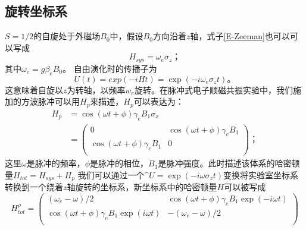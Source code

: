         \subsection{旋转坐标系}
        $S = 1/2$的自旋处于外磁场$B_0$中，假设$B_0$方向沿着$z$轴，式子\ref{E-Zeeman}也可以可以写成
            \begin{equation}
            H_{sys} = \omega_e \sigma_z；
            \end{equation}其中$\omega_e = g \beta_e B_0 $。
        自由演化时的传播子为
            \begin{equation}
            U(t)=exp(-iHt)=\exp(-i\omega_e\sigma_z t)。
            \end{equation}
        这意味着自旋以$z$为转轴，以频率$w_e$旋转。在脉冲式电子顺磁共振实验中，我们施加的方波脉冲可以用$H_p$来描述，$H_p$可以表达为：
            \begin{equation}
            \label{pulse-H}
                \begin{split}
                H_p &= \cos(\omega t+\phi )\gamma_e B_1\sigma_x \\
                    &= \left(
                              \begin{array}{cc}
                               0 & \cos(\omega t+\phi )\gamma_e B_1 \\
                               \cos(\omega t+\phi )\gamma_e B_1 & 0 \\
                              \end{array}
                              \right)
                ；
                \end{split}
            \end{equation}
        这里$\omega$是脉冲的频率，$\phi$是脉冲的相位，$B_1$是脉冲强度。此时描述该体系的哈密顿量$H_{tot} = H_{sys}+H_p$
        我们可以通过一个$\^{U}=\exp(-i\omega\sigma_z t)$变换将实验室坐标系转换到一个绕着$z$轴旋转的坐标系，新坐标系中的哈密顿量$H$可以被写成
            \begin{equation}
            \label{H-rotation1}
            H_{tot}^{\rho} = \left( \begin{array}{cc}
                               (\omega_e-\omega)/2 & \cos(\omega t+\phi )\gamma_e B_1 \exp(-i\omega t) \\
                               \cos(\omega t+\phi )\gamma_e B_1\exp(i\omega t) & -(\omega_e-\omega)/2 \\
                              \end{array}
                    \right)
            \end{equation}
